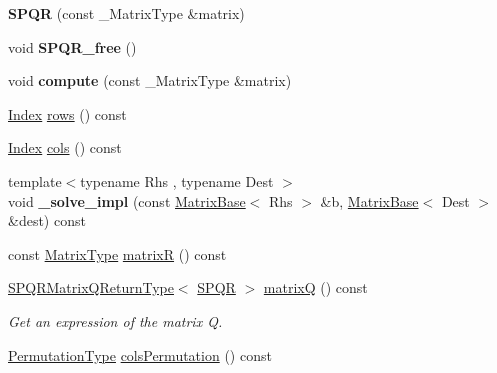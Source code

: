 \begin{DoxyCompactItemize}
{\bfseries S\+P\+QR} (const \+\_\+\+Matrix\+Type \&matrix)
\item 
\mbox{\label{class_eigen_1_1_s_p_q_r_a79687f3c4632760f5bb3a847ebdf5b7a}} 
void {\bfseries S\+P\+Q\+R\+\_\+free} ()
\item 
\mbox{\label{class_eigen_1_1_s_p_q_r_a9fb013cddbd9e634b7174f8d2a4bca33}} 
void {\bfseries compute} (const \+\_\+\+Matrix\+Type \&matrix)
\item 
\hyperlink{namespace_eigen_a62e77e0933482dafde8fe197d9a2cfde}{Index} \hyperlink{class_eigen_1_1_s_p_q_r_a775e28a44fd466638114edbcd17ea50a}{rows} () const
\item 
\hyperlink{namespace_eigen_a62e77e0933482dafde8fe197d9a2cfde}{Index} \hyperlink{class_eigen_1_1_s_p_q_r_aa006d40963b05c7525b5ca0b02364d84}{cols} () const
\item 
\mbox{\label{class_eigen_1_1_s_p_q_r_ad95a552802fd81383bda4222b0e3924b}} 
{\footnotesize template$<$typename Rhs , typename Dest $>$ }\\void {\bfseries \+\_\+solve\+\_\+impl} (const \hyperlink{group___core___module_class_eigen_1_1_matrix_base}{Matrix\+Base}$<$ Rhs $>$ \&b, \hyperlink{group___core___module_class_eigen_1_1_matrix_base}{Matrix\+Base}$<$ Dest $>$ \&dest) const
\item 
const \hyperlink{group___sparse_core___module}{Matrix\+Type} \hyperlink{class_eigen_1_1_s_p_q_r_ad51661be35674dd6a65e27699dbb3fb9}{matrixR} () const
\item 
\mbox{\label{class_eigen_1_1_s_p_q_r_a93dbf1b487e28948e1ca2a33a35b6a54}} 
\hyperlink{struct_eigen_1_1_s_p_q_r_matrix_q_return_type}{S\+P\+Q\+R\+Matrix\+Q\+Return\+Type}$<$ \hyperlink{class_eigen_1_1_s_p_q_r}{S\+P\+QR} $>$ \hyperlink{class_eigen_1_1_s_p_q_r_a93dbf1b487e28948e1ca2a33a35b6a54}{matrixQ} () const
\begin{DoxyCompactList}\small\item\em Get an expression of the matrix Q. \end{DoxyCompactList}\item 
\mbox{\label{class_eigen_1_1_s_p_q_r_ab1b7f54ba1cd8d77506ae676fea4fec0}} 
\hyperlink{group___core___module_class_eigen_1_1_map}{Permutation\+Type} \hyperlink{class_eigen_1_1_s_p_q_r_ab1b7f54ba1cd8d77506ae676fea4fec0}{cols\+Permutation} () const

\end{DoxyCompactItemize}
